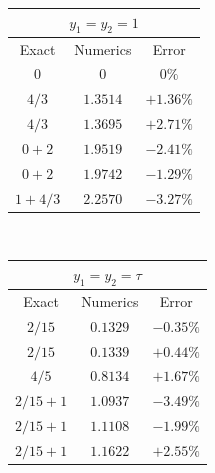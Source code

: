 \documentclass[aps,prb,reprint,superscriptaddress,amsfonts,amsmath,amssymb,showpacs,floatfix]{revtex4-1}
\begin{document}
\begin{table}
\begin{tabular}{|c|c|c|}
\hline
\multicolumn{3}{|c|}{$y_1=y_2=1$}\\
\hline\hline
Exact & Numerics & Error \\
\hline
$0$ & $0$ & $0\%$\\ %
$4/3$ & $1.3514$ & $+1.36\%$\\ %
$4/3$ & $1.3695$ & $+2.71\%$\\ %
$0+2$ & $1.9519$ & $-2.41\%$\\
$0+2$ & $1.9742$ & $-1.29\%$\\
$1+4/3$ & $2.2570$ & $-3.27\%$\\
\hline
\end{tabular}
~
\begin{tabular}{|c|c|c|}
\hline
\multicolumn{3}{|c|}{$y_1=y_2=\tau$}\\
\hline\hline
Exact & Numerics & Error \\
\hline
$2/15$ & $0.1329$ & $-0.35\%$\\ %
$2/15$  & $0.1339$ & $+0.44\%$\\ %
$4/5$ & $0.8134$ & $+1.67\%$\\ %
$2/15+1$ & $1.0937$ & $-3.49\%$\\
$2/15+1$   & $1.1108$ & $-1.99\%$\\
$2/15+1$ & $1.1622$ & $+2.55\%$\\
\hline
\end{tabular}

~

~


\end{table}
\end{document}
